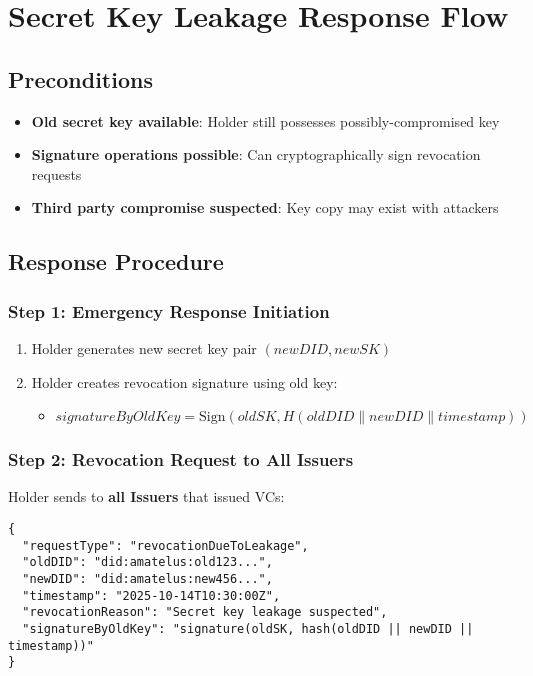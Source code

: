 \section{Secret Key Leakage Response Flow}

\subsection{Preconditions}

\begin{itemize}
  \item \textbf{Old secret key available}: Holder still possesses possibly-compromised key
  \item \textbf{Signature operations possible}: Can cryptographically sign revocation requests
  \item \textbf{Third party compromise suspected}: Key copy may exist with attackers
\end{itemize}

\subsection{Response Procedure}

\subsubsection{Step 1: Emergency Response Initiation}

\begin{enumerate}
  \item Holder generates new secret key pair $(newDID, newSK)$
  \item Holder creates revocation signature using old key:
    \begin{itemize}
      \item $signatureByOldKey = \text{Sign}(oldSK, H(oldDID \parallel newDID \parallel timestamp))$
    \end{itemize}
\end{enumerate}

\subsubsection{Step 2: Revocation Request to All Issuers}

Holder sends to \textbf{all Issuers} that issued VCs:

\begin{verbatim}
{
  "requestType": "revocationDueToLeakage",
  "oldDID": "did:amatelus:old123...",
  "newDID": "did:amatelus:new456...",
  "timestamp": "2025-10-14T10:30:00Z",
  "revocationReason": "Secret key leakage suspected",
  "signatureByOldKey": "signature(oldSK, hash(oldDID || newDID || timestamp))"
}
\end{verbatim}

